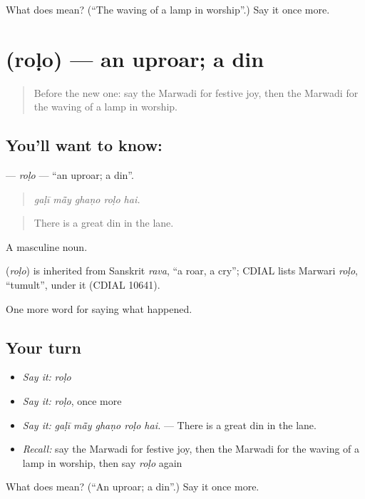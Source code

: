 \begin{tcolorbox}[breakable,colback=teal!4,colframe=teal!35!black,title={Before you move on}]
What does  mean? (\textquotedblleft{}The waving of a lamp in worship\textquotedblright{}.) Say it once more.
\end{tcolorbox}
\section[\texorpdfstring{\mw{रोळो} (roḷo)}{रोळो (roḷo)}]{ (roḷo) — an uproar; a din}

\label{lesson:MW-C250-rolo}



\begin{quote}
Before the new one: say the Marwadi for festive joy, then the Marwadi for the waving of a lamp in worship.
\end{quote}

\subsection*{You'll want to know: }
\textbf{} — \emph{roḷo} — \textquotedblleft{}an uproar; a din\textquotedblright{}.

\begin{quote}
    
\end{quote}

\begin{quote}
\emph{gaḷī mā̃y ghaṇo roḷo hai.}
\end{quote}

\begin{quote}
There is a great din in the lane.
\end{quote}

A masculine noun.

\begin{cousinweb}
\textbf{} (\emph{roḷo}) is inherited from Sanskrit \emph{rava}, \textquotedblleft{}a roar, a cry\textquotedblright{}; CDIAL lists Marwari \emph{roḷo}, \textquotedblleft{}tumult\textquotedblright{}, under it (CDIAL 10641).
\end{cousinweb}

\begin{grammarlens}[title={What you've built}]
One more word for saying what happened.
\end{grammarlens}

\subsection*{Your turn}
\begin{itemize}
\raggedright
  \item \emph{Say it:} \emph{roḷo}
  \item \emph{Say it:} \emph{roḷo}, once more
  \item \emph{Say it:} \emph{gaḷī mā̃y ghaṇo roḷo hai.} — There is a great din in the lane.
  \item \emph{Recall:} say the Marwadi for festive joy, then the Marwadi for the waving of a lamp in worship, then say \emph{roḷo} again
\end{itemize}

\begin{tcolorbox}[breakable,colback=teal!4,colframe=teal!35!black,title={Before you move on}]
What does  mean? (\textquotedblleft{}An uproar; a din\textquotedblright{}.) Say it once more.
\end{tcolorbox}
